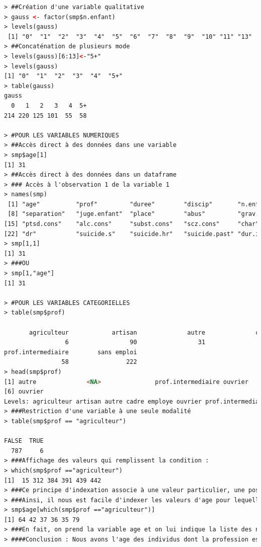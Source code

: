 \begin{lstlisting}[language=html]
> ##Création d'une variable qualitative
> gauss <- factor(smp$n.enfant)
> levels(gauss)
 [1] "0"  "1"  "2"  "3"  "4"  "5"  "6"  "7"  "8"  "9"  "10" "11" "13"
> ##Concaténation de plusieurs mode
> levels(gauss)[6:13]<-"5+"
> levels(gauss)
[1] "0"  "1"  "2"  "3"  "4"  "5+"
> table(gauss)
gauss
  0   1   2   3   4  5+ 
214 220 125 101  55  58 

> #POUR LES VARIABLES NUMERIQUES
> ##Accès direct à des données dans une variable
> smp$age[1]
[1] 31
> ##Accès direct à des données dans un dataframe
> ### Accès à l'observation 1 de la variable 1
> names(smp)
 [1] "age"          "prof"         "duree"        "discip"       "n.enfant"     "n.fratrie"    "ecole"       
 [8] "separation"   "juge.enfant"  "place"        "abus"         "grav.cons"    "dep.cons"     "ago.cons"    
[15] "ptsd.cons"    "alc.cons"     "subst.cons"   "scz.cons"     "char"         "rs"           "ed"          
[22] "dr"           "suicide.s"    "suicide.hr"   "suicide.past" "dur.interv"  
> smp[1,1]
[1] 31
> ###OU
> smp[1,"age"]
[1] 31

> #POUR LES VARIABLES CATEGORIELLES
> table(smp$prof)

       agriculteur            artisan              autre              cadre            employe            ouvrier 
                 6                 90                 31                 24                135                227 
prof.intermediaire        sans emploi 
                58                222 
> head(smp$prof)
[1] autre              <NA>               prof.intermediaire ouvrier            sans emploi       
[6] ouvrier           
Levels: agriculteur artisan autre cadre employe ouvrier prof.intermediaire sans emploi
> ###Restriction d'une variable à une seule modalité
> table(smp$prof == "agriculteur")

FALSE  TRUE 
  787     6 
> ###Affichage des valeurs qui remplissent la condition :
> which(smp$prof =="agriculteur")
[1]  15 312 384 391 439 442
> ###Ce principe d'indexation associe à une valeur particulier, une position donnée.
> ###Ainsi, il nous est facile d'indexer les valeurs d'age pour lequelles la profession du détenu est agriculteur
> smp$age[which(smp$prof =="agriculteur")]
[1] 64 42 37 36 35 79
> ###En fait, on prend la variable age et on lui indique la liste des numéros d'obervations qui nous intéressent
> ####Conclusion : Nous avons l'age des individus dont la profession est agriculteur.


\end{lstlisting}
